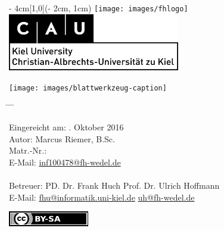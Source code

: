 
\begin{titlepage}
  \vspace*{25ex}
  \begin{textblock*}{\paperwidth - 4cm}[1,0](\paperwidth - 2cm, 1cm)
    \centering
    \texttt{[image: images/fhlogo]}
    \hfill
    \includegraphics[height=2.5cm]{images/logo-cau-kiel.png}
  \end{textblock*}
  \begin{center}
    \sffamily{}
    \texttt{[image: images/blattwerkzeug-caption]} \\[4ex]
    {\Large\docsubtitle}
  \end{center}
  \vspace*{20ex}
  \begin{tabbing}
    \hspace{8em} \= \hspace{14em} \= \hspace{8em} \= \kill

    Eingereicht am: . Oktober 2016 \\[5ex]
    Autor: \> Marcus Riemer, B.Sc. \\
    Matr.-Nr.:  \\
    E-Mail: \> \href{mailto:inf100478@fh-wedel.de}{inf100478@fh-wedel.de} \\

    \\
    Betreuer: \> PD. Dr. Frank Huch  \> Prof. Dr. Ulrich Hoffmann \\
    E-Mail: \> \href{mailto:fhu@informatik.uni-kiel.de}{fhu@informatik.uni-kiel.de} \> \href{mailto:uh@fh-wedel.de}{uh@fh-wedel.de}
  \end{tabbing}
  \vfill
  \centering \href{https://creativecommons.org/licenses/by-sa/4.0/}{\includegraphics{images/licenselogo}}
\end{titlepage}

\restoregeometry                 %

